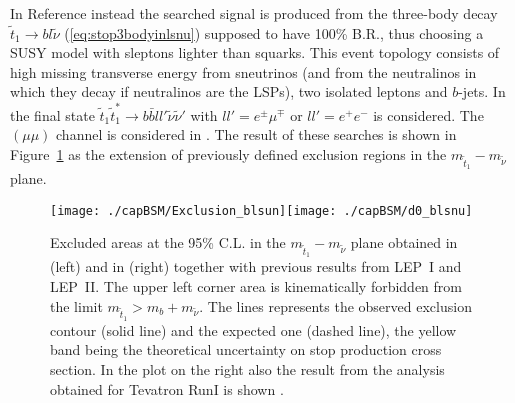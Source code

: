 In Reference \cite{abazov-2009-675} instead the searched signal is produced from the three-body decay $\tilde{t}_1 \rightarrow b l \tilde \nu$ (\ref{eq:stop3bodyinlsnu}) supposed to have 100\% B.R., thus choosing a SUSY model with sleptons lighter than squarks. This event topology consists of high missing transverse energy from sneutrinos (and from the neutralinos in which they decay if neutralinos are the LSPs), two isolated leptons and $b$-jets. In \cite{abazov-2009-675} the final state $\tilde{t}_1\tilde{t}_1^* \rightarrow b \bar b l l' \tilde\nu \tilde \nu'$ with $ll' = e^\pm \mu^\mp$ or $ll' = e^+ e^-$ is considered. The $(\mu\mu)$ channel is considered in \cite{abazov-2008-659}. The result of these searches is shown in Figure~\ref{Exclusion_blsun} as the extension of previously defined exclusion regions in the $m_{\tilde{t}_1}-m_{\tilde \nu}$ plane.

\begin{figure}[htb]\begin{center}
\texttt{[image: ./capBSM/Exclusion\_blsun]}\texttt{[image: ./capBSM/d0\_blsnu]}\caption{Excluded areas at the 95\% C.L. in the $m_{\tilde{t}_1}-m_{\tilde \nu}$ plane obtained in \cite{abazov-2009-675} (left) and in \cite{abazov-2008-659} (right) together with previous results from LEP~I and LEP~II. The upper left corner area is kinematically forbidden from the limit $m_{\tilde{t}_1} > m_b + m_{\tilde \nu}$. The lines represents  the observed exclusion contour (solid line) and the expected one (dashed line), the yellow band being the theoretical uncertainty on stop production cross section. In the plot on the right also the result from the analysis obtained for Tevatron RunI is shown \cite{abazov-2009-675,abazov-2008-659}.}
\label{Exclusion_blsun}\end{center}\end{figure} 

